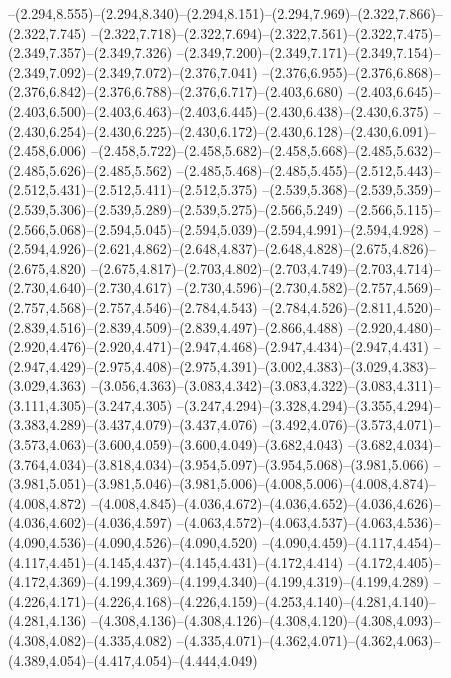  --(2.294,8.555)--(2.294,8.340)--(2.294,8.151)--(2.294,7.969)--(2.322,7.866)--(2.322,7.745)%
  --(2.322,7.718)--(2.322,7.694)--(2.322,7.561)--(2.322,7.475)--(2.349,7.357)--(2.349,7.326)%
  --(2.349,7.200)--(2.349,7.171)--(2.349,7.154)--(2.349,7.092)--(2.349,7.072)--(2.376,7.041)%
  --(2.376,6.955)--(2.376,6.868)--(2.376,6.842)--(2.376,6.788)--(2.376,6.717)--(2.403,6.680)%
  --(2.403,6.645)--(2.403,6.500)--(2.403,6.463)--(2.403,6.445)--(2.430,6.438)--(2.430,6.375)%
  --(2.430,6.254)--(2.430,6.225)--(2.430,6.172)--(2.430,6.128)--(2.430,6.091)--(2.458,6.006)%
  --(2.458,5.722)--(2.458,5.682)--(2.458,5.668)--(2.485,5.632)--(2.485,5.626)--(2.485,5.562)%
  --(2.485,5.468)--(2.485,5.455)--(2.512,5.443)--(2.512,5.431)--(2.512,5.411)--(2.512,5.375)%
  --(2.539,5.368)--(2.539,5.359)--(2.539,5.306)--(2.539,5.289)--(2.539,5.275)--(2.566,5.249)%
  --(2.566,5.115)--(2.566,5.068)--(2.594,5.045)--(2.594,5.039)--(2.594,4.991)--(2.594,4.928)%
  --(2.594,4.926)--(2.621,4.862)--(2.648,4.837)--(2.648,4.828)--(2.675,4.826)--(2.675,4.820)%
  --(2.675,4.817)--(2.703,4.802)--(2.703,4.749)--(2.703,4.714)--(2.730,4.640)--(2.730,4.617)%
  --(2.730,4.596)--(2.730,4.582)--(2.757,4.569)--(2.757,4.568)--(2.757,4.546)--(2.784,4.543)%
  --(2.784,4.526)--(2.811,4.520)--(2.839,4.516)--(2.839,4.509)--(2.839,4.497)--(2.866,4.488)%
  --(2.920,4.480)--(2.920,4.476)--(2.920,4.471)--(2.947,4.468)--(2.947,4.434)--(2.947,4.431)%
  --(2.947,4.429)--(2.975,4.408)--(2.975,4.391)--(3.002,4.383)--(3.029,4.383)--(3.029,4.363)%
  --(3.056,4.363)--(3.083,4.342)--(3.083,4.322)--(3.083,4.311)--(3.111,4.305)--(3.247,4.305)%
  --(3.247,4.294)--(3.328,4.294)--(3.355,4.294)--(3.383,4.289)--(3.437,4.079)--(3.437,4.076)%
  --(3.492,4.076)--(3.573,4.071)--(3.573,4.063)--(3.600,4.059)--(3.600,4.049)--(3.682,4.043)%
  --(3.682,4.034)--(3.764,4.034)--(3.818,4.034)--(3.954,5.097)--(3.954,5.068)--(3.981,5.066)%
  --(3.981,5.051)--(3.981,5.046)--(3.981,5.006)--(4.008,5.006)--(4.008,4.874)--(4.008,4.872)%
  --(4.008,4.845)--(4.036,4.672)--(4.036,4.652)--(4.036,4.626)--(4.036,4.602)--(4.036,4.597)%
  --(4.063,4.572)--(4.063,4.537)--(4.063,4.536)--(4.090,4.536)--(4.090,4.526)--(4.090,4.520)%
  --(4.090,4.459)--(4.117,4.454)--(4.117,4.451)--(4.145,4.437)--(4.145,4.431)--(4.172,4.414)%
  --(4.172,4.405)--(4.172,4.369)--(4.199,4.369)--(4.199,4.340)--(4.199,4.319)--(4.199,4.289)%
  --(4.226,4.171)--(4.226,4.168)--(4.226,4.159)--(4.253,4.140)--(4.281,4.140)--(4.281,4.136)%
  --(4.308,4.136)--(4.308,4.126)--(4.308,4.120)--(4.308,4.093)--(4.308,4.082)--(4.335,4.082)%
  --(4.335,4.071)--(4.362,4.071)--(4.362,4.063)--(4.389,4.054)--(4.417,4.054)--(4.444,4.049)%
